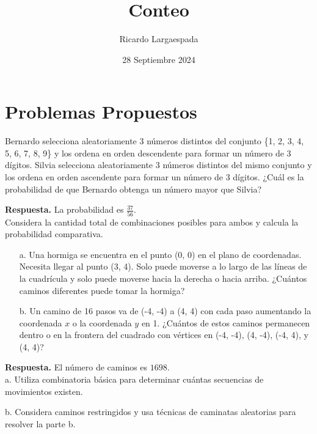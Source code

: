 \documentclass[11pt]{scrartcl}
\begin{document}
\title{Conteo}
\author{Ricardo Largaespada}
\date{28 Septiembre 2024}

\maketitle

\section{Problemas Propuestos}


\begin{problem}[AMC 2010]
Bernardo selecciona aleatoriamente 3 números distintos del conjunto \{1, 2, 3, 4, 5, 6, 7, 8, 9\} y los ordena en orden descendente para formar un número de 3 dígitos. Silvia selecciona aleatoriamente 3 números distintos del mismo conjunto y los ordena en orden ascendente para formar un número de 3 dígitos. ¿Cuál es la probabilidad de que Bernardo obtenga un número mayor que Silvia?
\begin{hint}
\textbf{Respuesta.} La probabilidad es \( \frac{37}{56} \).\\
Considera la cantidad total de combinaciones posibles para ambos y calcula la probabilidad comparativa.
\end{hint}
\end{problem}

\begin{problem}[AMC 2010]
\begin{itemize}
\item[a.] Una hormiga se encuentra en el punto (0, 0) en el plano de coordenadas. Necesita llegar al punto (3, 4). Solo puede moverse a lo largo de las líneas de la cuadrícula y solo puede moverse hacia la derecha o hacia arriba. ¿Cuántos caminos diferentes puede tomar la hormiga?

\item[b.] Un camino de 16 pasos va de (-4, -4) a (4, 4) con cada paso aumentando la coordenada \( x \) o la coordenada \( y \) en 1. ¿Cuántos de estos caminos permanecen dentro o en la frontera del cuadrado con vértices en (-4, -4), (4, -4), (-4, 4), y (4, 4)?
\end{itemize}
\begin{hint}
\textbf{Respuesta.} El número de caminos es \( 1698 \).\\

a. Utiliza combinatoria básica para determinar cuántas secuencias de movimientos existen.

b. Considera caminos restringidos y usa técnicas de caminatas aleatorias para resolver la parte b.
\end{hint}
\end{problem}
\end{document}
